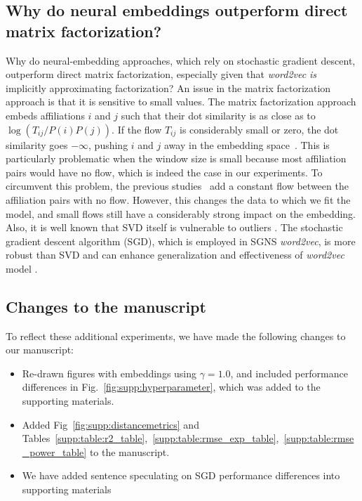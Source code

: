 \documentclass[12pt,a4paper]{article}
\begin{document}
\subsection{Why do neural embeddings outperform direct matrix factorization?}
Why do neural-embedding approaches, which rely on stochastic gradient descent, outperform direct matrix factorization, especially given that \textit{word2vec} \emph{is} implicitly approximating factorization?
An issue in the matrix factorization approach is that it is sensitive to small values. The matrix factorization approach embeds affiliations $i$ and $j$ such that their dot similarity is as close as to $\log (T_{ij} / P(i) P(j))$. If the flow $T_{ij}$ is considerably small or zero, the dot similarity goes $-\infty$, pushing $i$ and $j$ away in the embedding space~\autocite{levy2014neural, Qui2018}. This is particularly problematic when the window size is small because most affiliation pairs would have no flow, which is indeed the case in our experiments. To circumvent this problem, the previous studies~\autocite{levy2014neural, Qui2018} add a constant flow between the affiliation pairs with no flow. However, this changes the data to which we fit the model, and small flows still have a considerably strong impact on the embedding. Also, it is well known that SVD itself is vulnerable to outliers \autocite{xu2012robust, huber1981robust, xu1995robust, chandrasekaran2011rank, candes2011robust}.
The stochastic gradient descent algorithm (SGD), which is employed in SGNS \textit{word2vec}, is more robust than SVD and can enhance generalization and effectiveness of {\it word2vec} model \autocite{ma2018power, smith2020generalization, zhang2019algorithmic}.


\subsection{Changes to the manuscript}
To reflect these additional experiments, we have made the following changes to our manuscript:
\begin{itemize}
	\item Re-drawn figures with embeddings using $\gamma = 1.0$, and included performance differences in Fig.~\ref{fig:supp:hyperparameter}, which was added to the supporting materials.
	\item Added Fig~\ref{fig:supp:distancemetrics} and Tables~\ref{supp:table:r2_table},~\ref{supp:table:rmse_exp_table},~\ref{supp:table:rmse_power_table} to the manuscript.
	\item We have added sentence speculating on SGD performance differences into supporting materials
\end{itemize}
\end{document}
